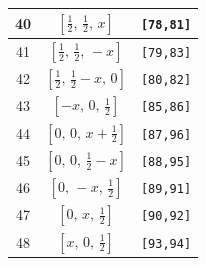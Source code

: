 \documentclass[fleqn,8pt]{jsarticle}
\begin{document}
\begin{longtable}{ccc}
40 & $\left[ \frac{1}{2},\, \frac{1}{2},\, x \right]$ & {\tt [78,81]} \\ \hline
41 & $\left[ \frac{1}{2},\, \frac{1}{2},\, - x \right]$ & {\tt [79,83]} \\ \hline
42 & $\left[ \frac{1}{2},\, \frac{1}{2} - x,\, 0 \right]$ & {\tt [80,82]} \\ \hline
43 & $\left[ - x,\, 0,\, \frac{1}{2} \right]$ & {\tt [85,86]} \\ \hline
44 & $\left[ 0,\, 0,\, x + \frac{1}{2} \right]$ & {\tt [87,96]} \\ \hline
45 & $\left[ 0,\, 0,\, \frac{1}{2} - x \right]$ & {\tt [88,95]} \\ \hline
46 & $\left[ 0,\, - x,\, \frac{1}{2} \right]$ & {\tt [89,91]} \\ \hline
47 & $\left[ 0,\, x,\, \frac{1}{2} \right]$ & {\tt [90,92]} \\ \hline
48 & $\left[ x,\, 0,\, \frac{1}{2} \right]$ & {\tt [93,94]} \\
\end{longtable}
\renewcommand{\arraystretch}{1.2}
\end{document}
